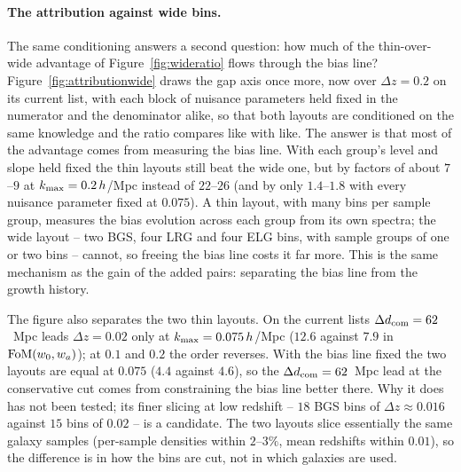 \documentclass[11pt]{article}
\newcommand{\dcom}{$\Delta d_{\rm com} = 62$~Mpc}
\begin{document}
\paragraph{The attribution against wide bins.}
The same conditioning answers a second question: how much of the
thin-over-wide advantage of Figure~\ref{fig:wideratio} flows through
the bias line?  Figure~\ref{fig:attributionwide} draws the gap axis
once more, now over $\Delta z = 0.2$ on its current list, with each
block of nuisance parameters held fixed in the numerator and the
denominator alike, so that both layouts are conditioned on the same
knowledge and the ratio compares like with like.  The answer is that
most of the advantage comes from measuring the bias line.  With each
group's level and slope held fixed the thin layouts still beat the
wide one, but by factors of about $7$--$9$ at
$k_{\rm max} = 0.2\,h$/Mpc instead of $22$--$26$ (and by only
$1.4$--$1.8$ with every nuisance parameter fixed at $0.075$).  A
thin layout, with many bins per sample group, measures the bias
evolution across each group from its own spectra; the wide layout --
two BGS, four LRG and four ELG bins, with sample groups of one or
two bins -- cannot, so freeing the bias line costs it far more.
This is the same mechanism as the gain of the added pairs:
separating the bias line from the growth history.

The figure also separates the two thin layouts.  On the current
lists \dcom{} leads $\Delta z = 0.02$ only at
$k_{\rm max} = 0.075\,h$/Mpc ($12.6$ against $7.9$ in
${\rm FoM}(w_0, w_a)$); at $0.1$ and $0.2$ the order reverses.  With
the bias line fixed the two layouts are equal at $0.075$ ($4.4$
against $4.6$), so the \dcom{} lead at the conservative cut comes
from constraining the bias line better there.  Why it does has not
been tested; its finer slicing at low redshift -- $18$ BGS bins of
$\Delta z \approx 0.016$ against $15$ bins of $0.02$ -- is a
candidate.  The two layouts slice essentially the same galaxy
samples (per-sample densities within $2$--$3\%$, mean redshifts
within $0.01$), so the difference is in how the bins are cut, not in
which galaxies are used.
\end{document}
